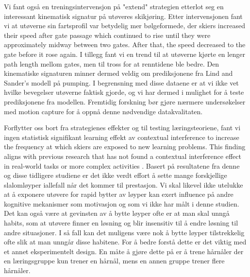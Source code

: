  














Vi fant også en treningsintervensjon på "extend" strategien etterlot seg en interessant kinematisk signatur på utøveres skikjøring. Etter intervensjonen fant vi at utøverne sin fartsprofil var betydelig mer bølgeformede, der skiers increased their speed after gate passage which continued to rise until they were approximately midway between two gates. After that, the speed decreased to the gate before it rose again. I tillegg fant vi en trend til at utøverne kjørte en lenger path length mellom gates, men til tross for at renntidene ble bedre. Den kinematiske signaturen minner dermed veldig om prediksjonene fra Lind and Sander's modell på pumping. I begrensning med disse dataene er at vi ikke vet hvilke bevegelser utøverne faktisk gjorde, og vi har dermed i mulighet for å teste prediksjonene fra modellen. Fremtidig forskning bør gjøre nærmere undersøkelser med motion capture for å oppnå denne nødvendige datakvalitaten.

Forflytter oss bort fra strategienes effekter og til testing læringsteoriene, fant vi ingen statistisk signifikant learning effekt av contextual interference to increase the frequency at which skiers are exposed to new learning problems. This finding aligns with previous research that has not found a contextual interference effect in real-world tasks or more complex activities \cite{brady_theoretical_1998, barreiros_contextual_2007, wulf_principles_2002}. Basert på resultatene fra denne og disse tidligere studiene er det ikke verdt effort å sette mange forskjellige slalomløyper iallefall når det kommer til prestasjon. Vi skal likevel ikke utelukke at å exponere utøvere for rapid bytter av løyper kan exert influence på andre kognitive mekanismer som motivasjon og som vi ikke har målt i denne studien. Det kan også være at gevinsten av å bytte løyper ofte er at man skal unngå habits, som at utøvere finner en løsning og blir insensitiv til å endre løsning til andre situasjoner. I så fall kan det muligens være nok å bytte løyper tilstrekkelig ofte slik at man unngår disse habitene. For å bedre forstå dette er det viktig med et annet eksperimentelt design. En måte å gjøre dette på er å trene hårnåler der en læringsgruppe kun trener en hårnål, mens en annen gruppe trener flere hårnåler. 















